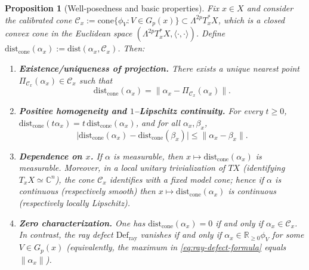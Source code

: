 \documentclass[11pt]{article}
\numberwithin{equation}{section}  %
\theoremstyle{plain}
\newtheorem{proposition}[theorem]{Proposition}
\theoremstyle{definition}
\theoremstyle{remark}
\newcommand{\R}{\mathbb{R}}
\newcommand{\C}{\mathbb{C}}
\newcommand{\dist}{\mathrm{dist}}
\newcommand{\Def}{\mathrm{Def}}
\newcommand{\cone}{\mathrm{cone}}
\newcommand{\distcone}{\dist_{\cone}}        %
\newcommand{\Gp}{G_p}
\begin{document}
\begin{proposition}[Well-posedness and basic properties]
\label{prop:dist-cal-properties}
Fix $x\in X$ and consider the calibrated cone
$\mathcal{C}_{x}:=\mathrm{cone}\{\phi_{V}:V\in\Gp(x)\}\subset \Lambda^{2p}T_x^*X$,
which is a closed convex cone in the Euclidean space $(\Lambda^{2p}T_x^*X,\langle\cdot,\cdot\rangle)$.
Define $\distcone(\alpha_{x}):=\dist(\alpha_{x},\mathcal{C}_{x})$.
Then:
\begin{enumerate}
\item[\textnormal{(1)}] \textbf{Existence/uniqueness of projection.}
There exists a unique nearest point $\Pi_{\mathcal{C}_{x}}(\alpha_{x})\in\mathcal{C}_{x}$ such that
\[
\distcone(\alpha_{x})=\|\alpha_{x}-\Pi_{\mathcal{C}_{x}}(\alpha_{x})\|.
\]
\item[\textnormal{(2)}] \textbf{Positive homogeneity and $1$--Lipschitz continuity.}
For every $t\ge 0$,
$\distcone(t\alpha_{x})=t\,\distcone(\alpha_{x})$,
and for all $\alpha_{x},\beta_{x}$,
\[
\bigl|\distcone(\alpha_{x})-\distcone(\beta_{x})\bigr|\le \|\alpha_{x}-\beta_{x}\|.
\]
\item[\textnormal{(3)}] \textbf{Dependence on $x$.}
If $\alpha$ is measurable, then $x\mapsto \distcone(\alpha_{x})$ is measurable.
Moreover, in a local unitary trivialization of $TX$ (identifying $T_xX\simeq\C^{n}$),
the cone $\mathcal{C}_{x}$ identifies with a fixed model cone; hence if $\alpha$ is continuous
(respectively smooth) then $x\mapsto \distcone(\alpha_{x})$ is continuous (respectively locally Lipschitz).
\item[\textnormal{(4)}] \textbf{Zero characterization.}
One has $\distcone(\alpha_{x})=0$ if and only if $\alpha_{x}\in\mathcal{C}_{x}$.
In contrast, the \emph{ray defect} $\Def_{\mathrm{ray}}$ vanishes if and only if
$\alpha_{x}\in \R_{\ge 0}\phi_{V}$ for some $V\in\Gp(x)$ (equivalently, the maximum in
\eqref{eq:ray-defect-formula} equals $\|\alpha_{x}\|$).
\end{enumerate}
\end{proposition}
\end{document}
